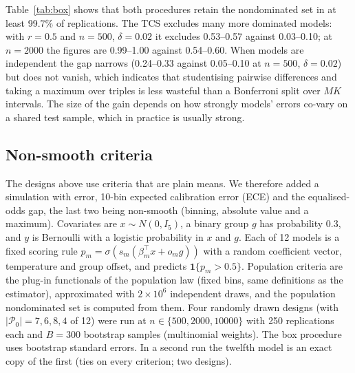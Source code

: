 \documentclass[11pt,a4paper]{article}
\begin{document}
Table~\ref{tab:box} shows that both procedures retain the nondominated set in at least 99.7\% of replications. The TCS excludes many more dominated models: with $r=0.5$ and $n=500$, $\delta=0.02$ it excludes 0.53--0.57 against 0.03--0.10; at $n=2000$ the figures are 0.99--1.00 against 0.54--0.60. When models are independent the gap narrows (0.24--0.33 against 0.05--0.10 at $n=500$, $\delta=0.02$) but does not vanish, which indicates that studentising pairwise differences and taking a maximum over triples is less wasteful than a Bonferroni split over $MK$ intervals. The size of the gain depends on how strongly models' errors co-vary on a shared test sample, which in practice is usually strong.

\begin{table}[h]\centering\small
\caption{Retention and exclusion for the TCS and the Bonferroni box procedure (300 replications per row). $r$: correlation between models' per-instance values; $\rho$: correlation between criteria. Retention is the minimum over the two settings of $r$.}\label{tab:box}

\end{table}

\subsection{Non-smooth criteria}\label{sec:nonsmooth}
The designs above use criteria that are plain means. We therefore added a simulation with error, 10-bin expected calibration error (ECE) and the equalised-odds gap, the last two being non-smooth (binning, absolute value and a maximum). Covariates are $x\sim N(0,I_5)$, a binary group $g$ has probability 0.3, and $y$ is Bernoulli with a logistic probability in $x$ and $g$. Each of 12 models is a fixed scoring rule $p_m=\sigma(s_m(\beta_m^\top x+o_m g))$ with a random coefficient vector, temperature and group offset, and predicts $\mathbf 1\{p_m>0.5\}$. Population criteria are the plug-in functionals of the population law (fixed bins, same definitions as the estimator), approximated with $2\times10^6$ independent draws, and the population nondominated set is computed from them. Four randomly drawn designs (with $|\mathcal{P}_0|=7,6,8,4$ of 12) were run at $n\in\{500,2000,10000\}$ with 250 replications each and $B=300$ bootstrap samples (multinomial weights). The box procedure uses bootstrap standard errors. In a second run the twelfth model is an exact copy of the first (ties on every criterion; two designs).
\end{document}
